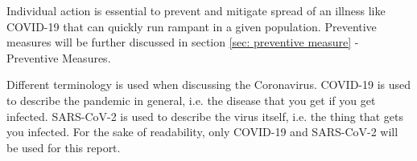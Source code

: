 Individual action is essential to prevent and mitigate spread of an illness like COVID-19 that can quickly run rampant in a given population. Preventive measures will be further discussed in section \ref{sec: preventive measure} - Preventive Measures.

Different terminology is used when discussing the Coronavirus. COVID-19 is used to describe the pandemic in general, i.e. the disease that you get if you get infected. SARS-CoV-2 is used to describe the virus itself, i.e. the thing that gets you infected. For the sake of readability, only COVID-19 and SARS-CoV-2 will be used for this report.



